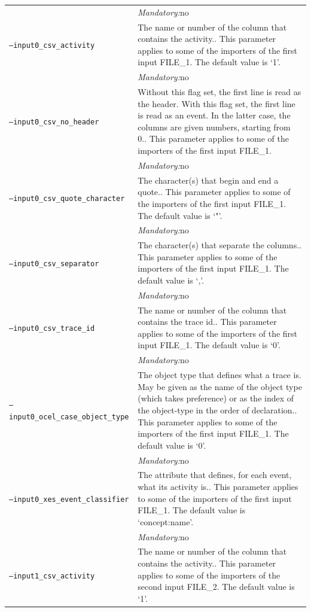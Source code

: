 {\begin{tabularx}{\linewidth}{lX}
&\textit{Mandatory:}\quad no\\
\texttt{--input0\_csv\_activity} & The name or number of the column that contains the activity.. This parameter applies to some of the importers of the first input FILE\_1. The default value is `1'.\\
&\textit{Mandatory:}\quad no\\
\texttt{--input0\_csv\_no\_header} & Without this flag set, the first line is read as the header. 
    With this flag set, the first line is read as an event. In the latter case, the columns are given numbers, starting from 0.. This parameter applies to some of the importers of the first input FILE\_1. \\
&\textit{Mandatory:}\quad no\\
\texttt{--input0\_csv\_quote\_character} & The character(s) that begin and end a quote.. This parameter applies to some of the importers of the first input FILE\_1. The default value is `"'.\\
&\textit{Mandatory:}\quad no\\
\texttt{--input0\_csv\_separator} & The character(s) that separate the columns.. This parameter applies to some of the importers of the first input FILE\_1. The default value is `,'.\\
&\textit{Mandatory:}\quad no\\
\texttt{--input0\_csv\_trace\_id} & The name or number of the column that contains the trace id.. This parameter applies to some of the importers of the first input FILE\_1. The default value is `0'.\\
&\textit{Mandatory:}\quad no\\
\texttt{--input0\_ocel\_case\_object\_type} & The object type that defines what a trace is. May be given as the name of the object type (which takes preference) or as the index of the object-type in the order of declaration.. This parameter applies to some of the importers of the first input FILE\_1. The default value is `0'.\\
&\textit{Mandatory:}\quad no\\
\texttt{--input0\_xes\_event\_classifier} & The attribute that defines, for each event, what its activity is.. This parameter applies to some of the importers of the first input FILE\_1. The default value is `concept:name'.\\
&\textit{Mandatory:}\quad no\\
\texttt{--input1\_csv\_activity} & The name or number of the column that contains the activity.. This parameter applies to some of the importers of the second input FILE\_2. The default value is `1'.\\

\end{tabularx}}
